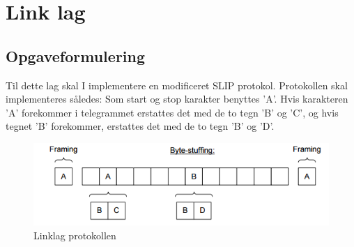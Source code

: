 \chapter{Link lag}

\section{Opgaveformulering}

Til dette lag skal I implementere en modificeret SLIP protokol.
Protokollen skal implementeres således: Som start og stop karakter benyttes ’A’. Hvis karakteren ’A’ forekommer i telegrammet erstattes det med de to tegn ’B’ og ’C’, og hvis tegnet ’B’ forekommer, erstattes det med de to tegn ’B’ og ’D’.

\begin{figure}[htbp]
\centering
\includegraphics[width=1\linewidth]{Subpages/Billeder/Linklag}
\caption{Linklag protokollen}
\label{fig:Linklag}
\end{figure}



